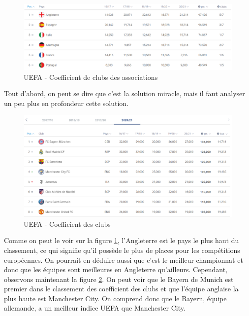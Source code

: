 \documentclass[a4paper,14pt]{extarticle}
\begin{document}
{\begin{figure}[htp]
    \centering
    \includegraphics[width=16cm]{../img/coeffClubAssoc.png}
    \caption{UEFA - Coefficient de clubs des associations}
    \label{fig:coeffClubsAssoc}
\end{figure}

Tout d'abord, on peut se dire que c'est la solution miracle, mais il faut analyser un peu plus en profondeur cette solution.

\begin{figure}[htp]
    \centering
    \includegraphics[width=16cm]{../img/coeffClubs.png}
    \caption{UEFA - Coefficient des clubs}
    \label{fig:coeffClubs}
\end{figure}

Comme on peut le voir sur la figure \ref{fig:coeffClubsAssoc}, l'Angleterre est le pays le plus haut du classement, ce qui signifie qu'il possède le plus de places pour les compétitions européennes. On pourrait en déduire aussi que c'est le meilleur championnat et donc que les équipes sont meilleures en Angleterre qu'ailleurs. Cependant, observons maintenant la figure \ref{fig:coeffClubs}. On peut voir que le Bayern de Munich est premier dans le classement des coefficient des clubs et que l'équipe anglaise la plus haute est Manchester City. On comprend donc que le Bayern, équipe allemande, a un meilleur indice UEFA que Manchester City.

}
\end{document}
